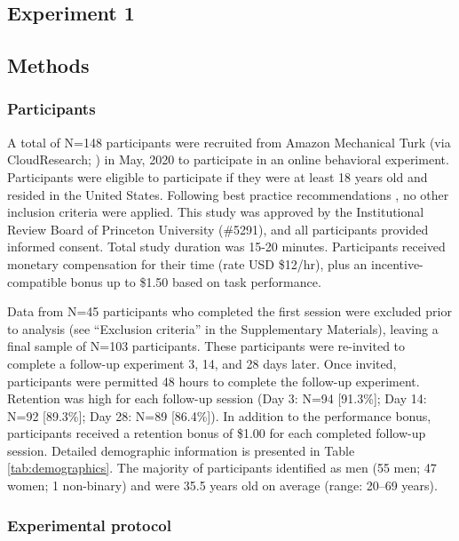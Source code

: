\documentclass[a4paper,12pt]{article}
\begin{document}
\begin{refsection}[main]

\section*{Experiment 1}

\subsection*{Methods}

\subsubsection*{Participants}

A total of N=148 participants were recruited from Amazon Mechanical Turk (via CloudResearch; \cite{litman2017turkprime}) in May, 2020 to participate in an online behavioral experiment. Participants were eligible to participate if they were at least 18 years old and resided in the United States. Following best practice recommendations \cite{robinson2019tapped}, no other inclusion criteria were applied. This study was approved by the Institutional Review Board of Princeton University (\#5291), and all participants provided informed consent. Total study duration was 15-20 minutes. Participants received monetary compensation for their time (rate USD \$12/hr), plus an incentive-compatible bonus up to \$1.50 based on task performance. 

Data from N=45 participants who completed the first session were excluded prior to analysis (see ``Exclusion criteria'' in the Supplementary Materials), leaving a final sample of N=103 participants. These participants were re-invited to complete a follow-up experiment 3, 14, and 28 days later. Once invited, participants were permitted 48 hours to complete the follow-up experiment. Retention was high for each follow-up session (Day 3: N=94 [91.3\%]; Day 14: N=92 [89.3\%]; Day 28: N=89 [86.4\%]). In addition to the performance bonus, participants received a retention bonus of \$1.00 for each completed follow-up session. Detailed demographic information is presented in Table \ref{tab:demographics}. The majority of participants identified as men (55 men; 47 women; 1 non-binary) and were 35.5 years old on average (range: 20--69 years).

\subsubsection*{Experimental protocol}


\end{refsection}
\end{document}
